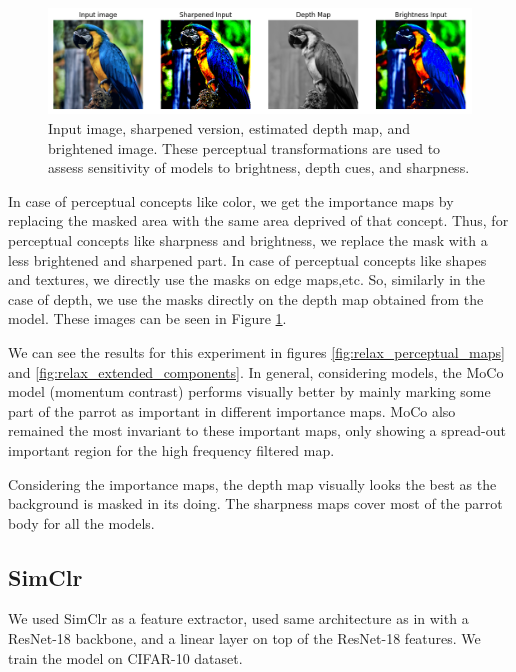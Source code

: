 \begin{figure}[h]
    \centering
    \includegraphics[width=\linewidth]{images/Sharpened, Depth and Brightened Maps.png}
    \caption{Input image, sharpened version, estimated depth map, and brightened image. These perceptual transformations are used to assess sensitivity of models to brightness, depth cues, and sharpness.}
    \label{fig:perceptual_variants}
\end{figure}

In case of perceptual concepts like color, we get the importance maps by replacing the masked area with the same area deprived of that concept. Thus, for perceptual concepts like sharpness and brightness, we replace the mask with a less brightened and sharpened part. In case of perceptual concepts like shapes and textures, we directly use the masks on edge maps,etc. So, similarly in the case of depth, we use the masks directly on the depth map obtained from the model. These images can be seen in Figure \ref{fig:perceptual_variants}.

We can see the results for this experiment in figures \ref{fig:relax_perceptual_maps} and \ref{fig:relax_extended_components}. In general, considering models, the MoCo model (momentum contrast) performs visually better by mainly marking some part of the parrot as important in different importance maps. MoCo also remained the most invariant to these important maps, only showing a spread-out important region for the high frequency filtered map.

Considering the importance maps, the depth map visually looks the best as the background is masked in its doing. The sharpness maps cover most of the parrot body for all the models.

\subsection{SimClr}
We used SimClr as a feature extractor, used same architecture as in \cite{chen2020simple} with a ResNet-18 backbone, and a linear layer on top of the ResNet-18 features. We train the model on CIFAR-10 dataset.

